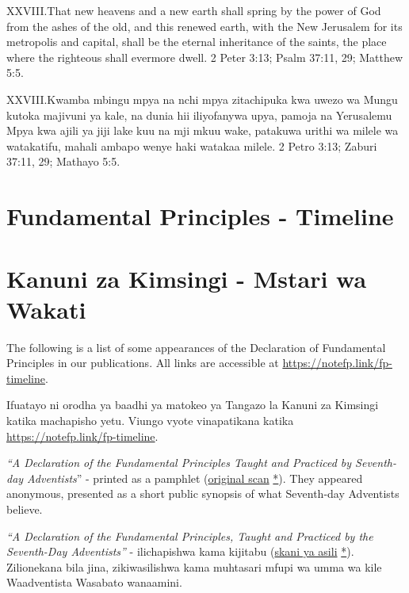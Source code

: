 \lettrine{XXVIII.} That new heavens and a new earth shall spring by the power of God from the ashes of the old, and this renewed earth, with the New Jerusalem for its metropolis and capital, shall be the eternal inheritance of the saints, the place where the righteous shall evermore dwell. 2 Peter 3:13; Psalm 37:11, 29; Matthew 5:5.


\lettrine{XXVIII.} Kwamba mbingu mpya na nchi mpya zitachipuka kwa uwezo wa Mungu kutoka majivuni ya kale, na dunia hii iliyofanywa upya, pamoja na Yerusalemu Mpya kwa ajili ya jiji lake kuu na mji mkuu wake, patakuwa urithi wa milele wa watakatifu, mahali ambapo wenye haki watakaa milele. 2 Petro 3:13; Zaburi 37:11, 29; Mathayo 5:5.


\section*{Fundamental Principles - Timeline} \label{appendix:timeline}


\section*{Kanuni za Kimsingi - Mstari wa Wakati} \label{appendix:timeline}


The following is a list of some appearances of the Declaration of Fundamental Principles in our publications. All links are accessible at \href{https://notefp.link/fp-timeline}{https://notefp.link/fp-timeline}.


Ifuatayo ni orodha ya baadhi ya matokeo ya Tangazo la Kanuni za Kimsingi katika machapisho yetu. Viungo vyote vinapatikana katika \href{https://notefp.link/fp-timeline}{https://notefp.link/fp-timeline}.






\textit{“A Declaration of the Fundamental Principles Taught and Practiced by Seventh-day Adventists}” - printed as a pamphlet (\href{https://adventistdigitallibrary.org/islandora/object/adl:366607?link_only=true}{original scan} \href{https://forgotten-pillar.s3.us-east-2.amazonaws.com/A+declaration+of+the+fundamental+principles+taught+and+practiced+by+the+Seventh-day+Adventists++.pdf}{*}). They appeared anonymous, presented as a short public synopsis of what Seventh-day Adventists believe.


\textit{“A Declaration of the Fundamental Principles, Taught and Practiced by the Seventh-Day Adventists”} - ilichapishwa kama kijitabu (\href{https://adventistdigitallibrary.org/islandora/object/adl:366607?link_only=true}{skani ya asili} \href{https://forgotten-pillar.s3.us-east-2.amazonaws.com/A+declaration+of+the+fundamental+principles+taught+and+practiced+by+the+Seventh-day+Adventists++.pdf}{*}). Zilionekana bila jina, zikiwasilishwa kama muhtasari mfupi wa umma wa kile Waadventista Wasabato wanaamini.


